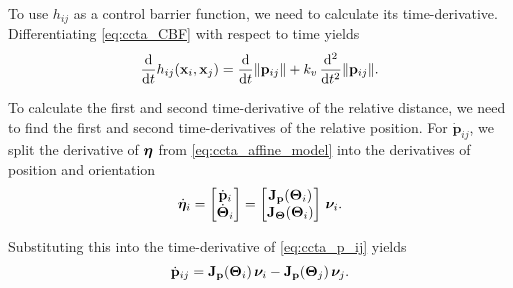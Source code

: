 To use $h_{ij}$ as a control barrier function, we need to calculate its time-derivative.
Differentiating \eqref{eq:ccta_CBF} with respect to time yields
\begin{equation}
    \frac{\rm d}{{\rm d}t}h_{ij}(\mathbf{x}_{i}, \mathbf{x}_{j}) = \frac{\rm d}{{\rm d}t}\|\mathbf{p}_{ij}\| + k_v\,\frac{\rm d^2}{{\rm d}t^2}\|\mathbf{p}_{ij}\|.
\end{equation}



To calculate the first and second time-derivative of the relative distance, we need to find the first and second time-derivatives of the relative position.
For $\dot{\mathbf{p}}_{ij}$, we split the derivative of $\bm{\eta}$ from \eqref{eq:ccta_affine_model} into the derivatives of position and orientation \vspace{-2mm}
\begin{equation}
    \dot{\bm{\eta}}_{i} = \begin{bmatrix} \dot{\mathbf{p}}_{i} \\ \dot{\bm{\Theta}}_{i} \end{bmatrix} = \begin{bmatrix}
        \mathbf{J}_{\mathbf{p}}(\bm{\Theta}_{i}) \\ \mathbf{J}_{\bm{\Theta}}(\bm{\Theta}_{i})
    \end{bmatrix}\,\bm{\nu}_{i}.
\end{equation}

\noindent Substituting this into the time-derivative of \eqref{eq:ccta_p_ij} yields
\begin{equation}
    \dot{\mathbf{p}}_{ij} = \mathbf{J}_{\mathbf{p}}(\bm{\Theta}_{i}) \, \bm{\nu}_{i} - \mathbf{J}_{\mathbf{p}}(\bm{\Theta}_{j}) \, \bm{\nu}_{j}.
    \label{eq:ccta_p_dot}
\end{equation}

